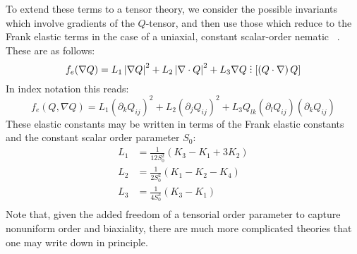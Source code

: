 \documentclass[reqno]{article}
\begin{document}
  To extend these terms to a tensor theory, we consider the possible
  invariants which involve gradients of the $Q$-tensor, and then use those which
  reduce to the Frank elastic terms in the case of a uniaxial, constant
  scalar-order nematic ~\cite{mottram_introduction_2014}.
  These are as follows:
  \begin{equation} \label{eq:elastic-free-energy}
    f_e (\nabla Q)
    = L_1 \left| \nabla Q \right|^2
    + L_2 \left| \nabla \cdot Q \right|^2
    + L_3 \nabla Q  \divby \left[ \left( Q \cdot \nabla \right) Q \right]
  \end{equation}
  In index notation this reads:
  \begin{equation}
    f_e (Q, \nabla Q)
    =
    L_1 \left( \partial_k Q_{ij} \right)^2
    + L_2 \left( \partial_j Q_{ij} \right)^2
    + L_3 Q_{lk} \left( \partial_{l} Q_{ij} \right) \left( \partial_k Q_{ij} \right)
  \end{equation}
  These elastic constants may be written in terms of the Frank elastic constants
  and the constant scalar order parameter $S_0$:
  \begin{equation} \label{eq:elastic-constants-mapping}
    \begin{split}
      L_1 &= \frac{1}{12 S_0^2} (K_3 - K_1 + 3 K_2) \\
      L_2 &= \frac{1}{2 S_0^2} (K_1 - K_2 - K_4) \\
      L_3 &= \frac{1}{4 S_0^3} (K_3 - K_1) \\
    \end{split}
  \end{equation}
  Note that, given the added freedom of a tensorial order parameter to capture
  nonuniform order and biaxiality, there are much more complicated theories that
  one may write down in principle.
  
\end{document}
